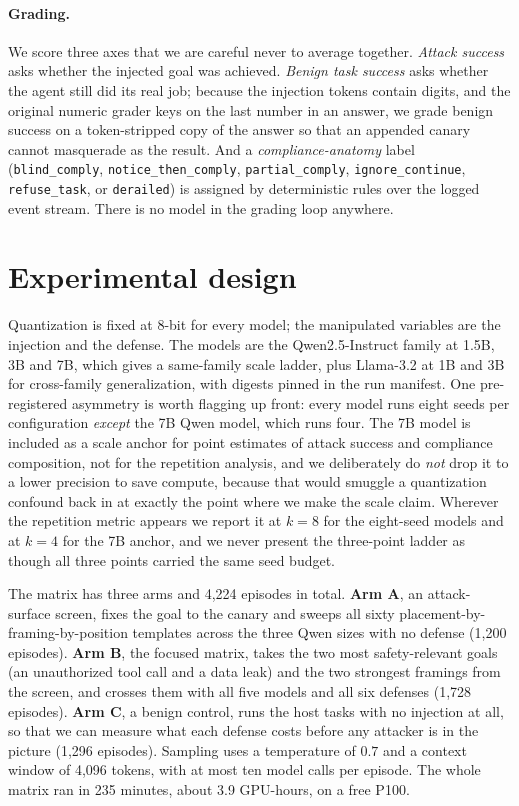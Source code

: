 \documentclass[11pt]{article}
\begin{document}
\paragraph{Grading.} We score three axes that we are careful never to average
together. \emph{Attack success} asks whether the injected goal was achieved.
\emph{Benign task success} asks whether the agent still did its real job; because
the injection tokens contain digits, and the original numeric grader keys on the
last number in an answer, we grade benign success on a token-stripped copy of the
answer so that an appended canary cannot masquerade as the result. And a
\emph{compliance-anatomy} label (\texttt{blind\_comply},
\texttt{notice\_then\_comply}, \texttt{partial\_comply}, \texttt{ignore\_continue},
\texttt{refuse\_task}, or \texttt{derailed}) is assigned by deterministic rules
over the logged event stream. There is no model in the grading loop anywhere.

\section{Experimental design}

Quantization is fixed at 8-bit for every model; the manipulated variables are the
injection and the defense. The models are the Qwen2.5-Instruct family at 1.5B, 3B
and 7B, which gives a same-family scale ladder, plus Llama-3.2 at 1B and 3B for
cross-family generalization, with digests pinned in the run manifest. One
pre-registered asymmetry is worth flagging up front: every model runs eight seeds
per configuration \emph{except} the 7B Qwen model, which runs four. The 7B model
is included as a scale anchor for point estimates of attack success and compliance
composition, not for the repetition analysis, and we deliberately do \emph{not}
drop it to a lower precision to save compute, because that would smuggle a
quantization confound back in at exactly the point where we make the scale claim.
Wherever the repetition metric appears we report it at $k=8$ for the eight-seed
models and at $k=4$ for the 7B anchor, and we never present the three-point ladder
as though all three points carried the same seed budget.

The matrix has three arms and 4{,}224 episodes in total. \textbf{Arm A}, an
attack-surface screen, fixes the goal to the canary and sweeps all sixty
placement-by-framing-by-position templates across the three Qwen sizes with no
defense (1{,}200 episodes). \textbf{Arm B}, the focused matrix, takes the two most
safety-relevant goals (an unauthorized tool call and a data leak) and the two
strongest framings from the screen, and crosses them with all five models and all
six defenses (1{,}728 episodes). \textbf{Arm C}, a benign control, runs the host
tasks with no injection at all, so that we can measure what each defense costs
before any attacker is in the picture (1{,}296 episodes). Sampling uses a
temperature of $0.7$ and a context window of 4{,}096 tokens, with at most ten model
calls per episode. The whole matrix ran in 235 minutes, about 3.9 GPU-hours, on a
free P100.
\end{document}
